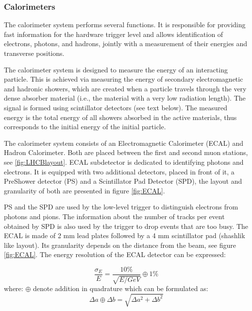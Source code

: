 \subsubsection{Calorimeters}

The calorimeter system performs several functions. It is responsible for providing fast information for the hardware trigger level and allows identification of electrons, photons, and hadrons, jointly with a measurement of their energies and transverse positions.

The calorimeter system is designed to measure the energy of an interacting particle. This is achieved via measuring the energy of secondary electromagnetic and hadronic showers, which are created when a particle travels through the very dense absorber material (i.e., the material with a very low radiation length). The signal is formed using scintillator detectors (see text below). The measured energy is the total energy of all showers absorbed in the active materials, thus corresponds to the initial energy of the initial particle. 

The calorimeter system consists of an Electromagnetic Calorimeter (ECAL) and Hadron Calorimeter.  Both are placed between the first and second muon stations, see \ref{fig:LHCBlayout}. ECAL subdetector is dedicated to identifying photons and electrons.  It is equipped with two additional detectors, placed in front of it, a PreShower detector (PS) and a Scintillator Pad Detector (SPD), the layout and granularity of both are presented in figure \ref{fig:ECAL}. 

PS and the SPD are used by the low-level trigger to distinguish electrons from photons and pions. The information about the number of tracks per event obtained by SPD is also used by the trigger to drop events that are too busy. 
The ECAL is made of 2 mm lead plates followed by a 4 mm scintillator pad (shashlik like layout).  Its granularity depends on the distance from the beam, see figure \ref{fig:ECAL}.
The energy resolution of the ECAL detector can be expressed: 

\begin{equation}
    \frac{\sigma_{E}}{E} = \frac{10\%}{\sqrt{E/GeV}} \oplus     1 \%
\end{equation}
where: $\oplus $ denote addition in quadrature which can be formulated as: 
\begin{equation}
   \Delta a\oplus \Delta b = \sqrt{\Delta a^2 + \Delta b^2} 
\end{equation}


